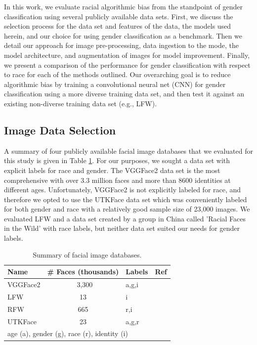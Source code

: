 \documentclass[obeyspaces, spaces, fleqn,10pt]{SelfArx} %
\begin{document}
In this work, we evaluate racial algorithmic bias from the standpoint of gender classification using several publicly available data sets. First, we discuss the selection process for the data set and features of the data, the models used herein, and our choice for using gender classification as a benchmark. Then we detail our approach for image pre-processing, data ingestion to the mode, the model architecture, and augmentation of images for model improvement. Finally, we present a comparison of the performance for gender classification with respect to race for each of the methods outlined. Our overarching goal is to reduce algorithmic bias by training a convolutional neural net (CNN) for gender classification using a more diverse training data set, and then test it against an existing non-diverse training data set (e.g., LFW).

\subsection{Image Data Selection}
A summary of four publicly available facial image databases that we evaluated for this study is given in Table \ref{tab:tab1}. For our purposes, we sought a data set with explicit labels for race and gender. The VGGFace2 data set is the most comprehensive with over 3.3 million faces and more than 8600 identities at different ages.\cite{Cao18} Unfortunately, VGGFace2 is not explicitly labeled for race, and therefore we opted to use the UTKFace data set which was conveniently labeled for both gender and race with a relatively good sample size of 23,000 images.\cite{utkface} We evaluated LFW and a data set created by a group in China called 'Racial Faces in the Wild' with race labels, but neither data set suited our needs for gender labels.\cite{LFWTech,wang:2018} 

\begin{table}[hbt]
\caption{Summary of facial image databases.}
\centering
\begin{tabular}{lclc}
\toprule
Name & \# Faces (thousands) & Labels & Ref \\
\midrule
VGGFace2 & ~3,300 & a,g,i & \cite{Cao18} \\
LFW & 13 & i & \cite{LFWTech} \\
RFW & 665 & r,i & \cite{wang:2018} \\
UTKFace & 23 & a,g,r & \cite{utkface} \\
\bottomrule
\multicolumn{4}{l}{age (a), gender (g), race (r), identity (i)} \\
\end{tabular}
\label{tab:tab1}
\end{table}
\end{document}
